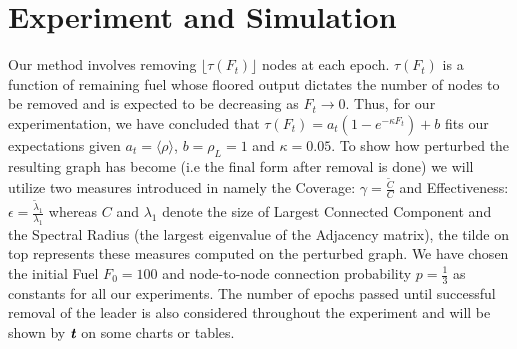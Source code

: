 \documentclass{article}
\begin{document}
	\section{Experiment and Simulation}
	Our method involves removing $\lfloor \tau(F_t)\rfloor$ nodes at each epoch. $\tau(F_t)$ is a function of remaining fuel whose floored output dictates the number of nodes to be removed and is expected to be decreasing as $F_t \rightarrow 0$. Thus, for our experimentation, we have concluded that $\tau(F_t)=a_{t}(1-e^{-\kappa F_t})+b$ fits our expectations given $a_t = \langle \rho \rangle$, $b = \rho_L =1$ and $\kappa=0.05$.
	To show how perturbed the resulting graph has become (i.e the final form after removal is done) we will utilize two measures introduced in \cite{ProbabNodeFailure} namely the Coverage: $\gamma = \frac{\widetilde C}{C}$ and Effectiveness: $\epsilon = \frac{\widetilde \lambda_1}{\lambda_1}$ whereas $C$ and $\lambda_1$ denote the size of Largest Connected Component and the Spectral Radius (the largest eigenvalue of the Adjacency matrix), the tilde on top represents these measures computed on the perturbed graph. We have chosen the initial Fuel $F_0=100$ and node-to-node connection probability $p=\frac{1}{3}$ as constants for all our experiments. The number of epochs passed until successful removal of the leader is also considered throughout the experiment and will be shown by $\textit{\textbf{t}}$ on some charts or tables.
\end{document}
